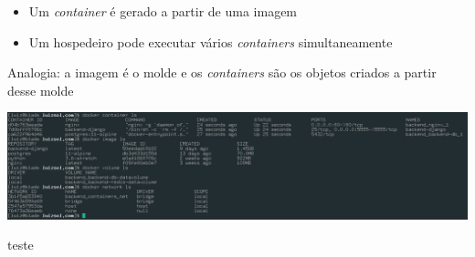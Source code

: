 \documentclass[
  ignorenonframetext,
]{beamer}
\providecommand{\tightlist}{%
  \setlength{\itemsep}{0pt}\setlength{\parskip}{0pt}}
\begin{document}
\begin{frame}

\begin{itemize}
\tightlist
\item
  Um \emph{container} é gerado a partir de uma imagem
\item
  Um hospedeiro pode executar vários \emph{containers} simultaneamente
\end{itemize}

\end{frame}

\begin{frame}

Analogia: a imagem é o molde e os \emph{containers} são os objetos
criados a partir desse molde

\end{frame}

\begin{frame}

\includegraphics{img/containers.jpg}

\end{frame}

\begin{frame}

teste

\end{frame}
\end{document}
